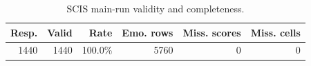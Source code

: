 \begin{table}[t]
\centering
\caption{SCIS main-run validity and completeness.}
\label{tab:scis-validity}
\begin{tabular}{rrrrrr}
\hline
Resp. & Valid & Rate & Emo. rows & Miss. scores & Miss. cells \\
\hline
1440 & 1440 & 100.0\% & 5760 & 0 & 0 \\
\hline
\end{tabular}
\end{table}
